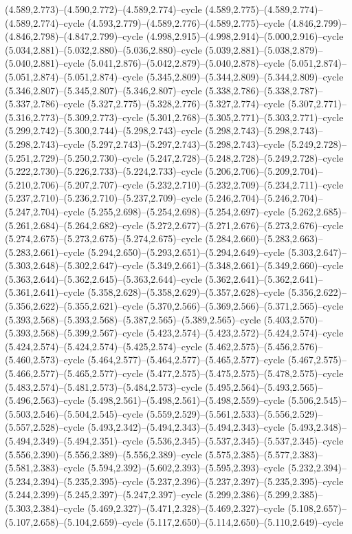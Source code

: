 (4.589,2.773)--(4.590,2.772)--(4.589,2.774)--cycle (4.589,2.775)--(4.589,2.774)--(4.589,2.774)--cycle (4.593,2.779)--(4.589,2.776)--(4.589,2.775)--cycle (4.846,2.799)--(4.846,2.798)--(4.847,2.799)--cycle (4.998,2.915)--(4.998,2.914)--(5.000,2.916)--cycle (5.034,2.881)--(5.032,2.880)--(5.036,2.880)--cycle (5.039,2.881)--(5.038,2.879)--(5.040,2.881)--cycle (5.041,2.876)--(5.042,2.879)--(5.040,2.878)--cycle (5.051,2.874)--(5.051,2.874)--(5.051,2.874)--cycle (5.345,2.809)--(5.344,2.809)--(5.344,2.809)--cycle (5.346,2.807)--(5.345,2.807)--(5.346,2.807)--cycle (5.338,2.786)--(5.338,2.787)--(5.337,2.786)--cycle (5.327,2.775)--(5.328,2.776)--(5.327,2.774)--cycle (5.307,2.771)--(5.316,2.773)--(5.309,2.773)--cycle (5.301,2.768)--(5.305,2.771)--(5.303,2.771)--cycle (5.299,2.742)--(5.300,2.744)--(5.298,2.743)--cycle (5.298,2.743)--(5.298,2.743)--(5.298,2.743)--cycle (5.297,2.743)--(5.297,2.743)--(5.298,2.743)--cycle (5.249,2.728)--(5.251,2.729)--(5.250,2.730)--cycle (5.247,2.728)--(5.248,2.728)--(5.249,2.728)--cycle (5.222,2.730)--(5.226,2.733)--(5.224,2.733)--cycle (5.206,2.706)--(5.209,2.704)--(5.210,2.706)--(5.207,2.707)--cycle (5.232,2.710)--(5.232,2.709)--(5.234,2.711)--cycle (5.237,2.710)--(5.236,2.710)--(5.237,2.709)--cycle (5.246,2.704)--(5.246,2.704)--(5.247,2.704)--cycle (5.255,2.698)--(5.254,2.698)--(5.254,2.697)--cycle (5.262,2.685)--(5.261,2.684)--(5.264,2.682)--cycle (5.272,2.677)--(5.271,2.676)--(5.273,2.676)--cycle (5.274,2.675)--(5.273,2.675)--(5.274,2.675)--cycle (5.284,2.660)--(5.283,2.663)--(5.283,2.661)--cycle (5.294,2.650)--(5.293,2.651)--(5.294,2.649)--cycle (5.303,2.647)--(5.303,2.648)--(5.302,2.647)--cycle (5.349,2.661)--(5.348,2.661)--(5.349,2.660)--cycle (5.363,2.644)--(5.362,2.645)--(5.363,2.644)--cycle (5.362,2.641)--(5.362,2.641)--(5.361,2.641)--cycle (5.358,2.628)--(5.358,2.629)--(5.357,2.628)--cycle (5.356,2.622)--(5.356,2.622)--(5.355,2.621)--cycle (5.370,2.566)--(5.369,2.566)--(5.371,2.565)--cycle (5.393,2.568)--(5.393,2.568)--(5.387,2.565)--(5.389,2.565)--cycle (5.403,2.570)--(5.393,2.568)--(5.399,2.567)--cycle (5.423,2.574)--(5.423,2.572)--(5.424,2.574)--cycle (5.424,2.574)--(5.424,2.574)--(5.425,2.574)--cycle (5.462,2.575)--(5.456,2.576)--(5.460,2.573)--cycle (5.464,2.577)--(5.464,2.577)--(5.465,2.577)--cycle (5.467,2.575)--(5.466,2.577)--(5.465,2.577)--cycle (5.477,2.575)--(5.475,2.575)--(5.478,2.575)--cycle (5.483,2.574)--(5.481,2.573)--(5.484,2.573)--cycle (5.495,2.564)--(5.493,2.565)--(5.496,2.563)--cycle (5.498,2.561)--(5.498,2.561)--(5.498,2.559)--cycle (5.506,2.545)--(5.503,2.546)--(5.504,2.545)--cycle (5.559,2.529)--(5.561,2.533)--(5.556,2.529)--(5.557,2.528)--cycle (5.493,2.342)--(5.494,2.343)--(5.494,2.343)--cycle (5.493,2.348)--(5.494,2.349)--(5.494,2.351)--cycle (5.536,2.345)--(5.537,2.345)--(5.537,2.345)--cycle (5.556,2.390)--(5.556,2.389)--(5.556,2.389)--cycle (5.575,2.385)--(5.577,2.383)--(5.581,2.383)--cycle (5.594,2.392)--(5.602,2.393)--(5.595,2.393)--cycle (5.232,2.394)--(5.234,2.394)--(5.235,2.395)--cycle (5.237,2.396)--(5.237,2.397)--(5.235,2.395)--cycle (5.244,2.399)--(5.245,2.397)--(5.247,2.397)--cycle (5.299,2.386)--(5.299,2.385)--(5.303,2.384)--cycle (5.469,2.327)--(5.471,2.328)--(5.469,2.327)--cycle (5.108,2.657)--(5.107,2.658)--(5.104,2.659)--cycle (5.117,2.650)--(5.114,2.650)--(5.110,2.649)--cycle 